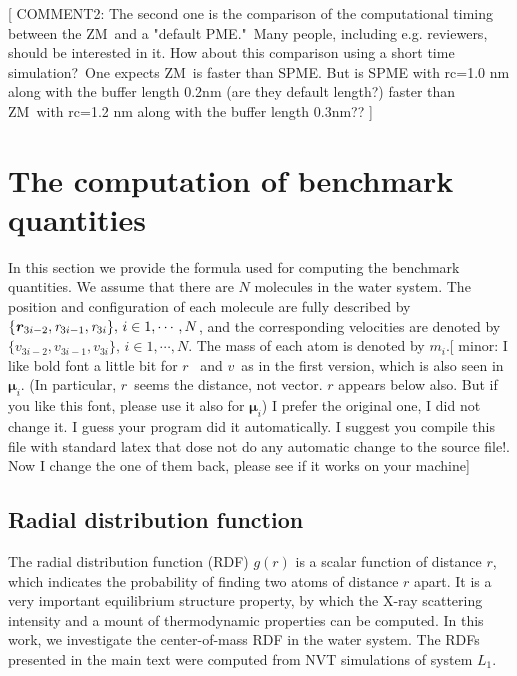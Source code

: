 \documentclass[a4paper,preprint,unsortedaddress,onecolumn,fleqn]{revtex4}
\newcommand{\recheck}[1]{{\color{red} #1}}
\newcommand{\vect}[1]{\textbf{\textit{#1}}}
\begin{document}
[ {\color{blue} COMMENT2: The second one is the comparison of the
computational timing between the ZM\ and a "default PME."\ Many people,
including e.g. reviewers, should be interested in it. How about this
comparison using a short time simulation?\ One expects ZM\ is faster than
SPME. But is SPME with rc=1.0 nm along with the buffer length 0.2nm (are
they default length?) faster than ZM\ with rc=1.2 nm along with the buffer
length 0.3nm?? }]

\appendix

\section{The computation of benchmark quantities}

\label{appendix:benchmark}

In this section we provide the formula used for computing the benchmark
quantities. We assume that there are $N$ molecules in the water system. The
position and configuration of each molecule are fully described by $\{\vect r_{3i-2},\mathbf{\mathit{r}}_{3i-1},\mathbf{\mathit{r}}
_{3i}\},\,i\in 1,\cdots ,N$, and the corresponding velocities are denoted by 
$\{\mathbf{\mathit{v}}_{3i-2},\mathbf{\mathit{v}}_{3i-1},\mathbf{\mathit{v}}%
_{3i}\},\,i\in 1,\cdots ,N$. The mass of each atom is denoted by $m_{i}$.[ {%
\color{blue} minor: I like bold font a little bit for $\mathbf{\mathit{r}}${%
\ and }$\mathbf{\mathit{v}}${\ as in the first version, which is also seen
in }$\boldsymbol{\mu }_{i}${. (In particular, }$\mathbf{\mathit{r}}${\ seems
the distance, not vector. $\mathbf{\mathit{r}}$ appears below also. But if
you like this font, please use it also for $\boldsymbol{\mu }_{i}$)}} \recheck{I prefer the original one, I did not change it. I guess your program did it automatically. I suggest you compile this file with standard latex that dose not do any automatic change to the source file!. Now I change the one of them back, please see if it works on your machine}]

\subsection{Radial distribution function}

The radial distribution function (RDF) $g(r)$ is a scalar function of
distance $r$, which indicates the probability of finding two atoms of
distance $r$ apart. It is a very important equilibrium structure property,
by which the X-ray scattering intensity and a mount of thermodynamic
properties can be computed. In this work, we investigate the center-of-mass
RDF in the water system. The RDFs presented in the main text were computed
from NVT simulations of system $L_1$.
\end{document}
